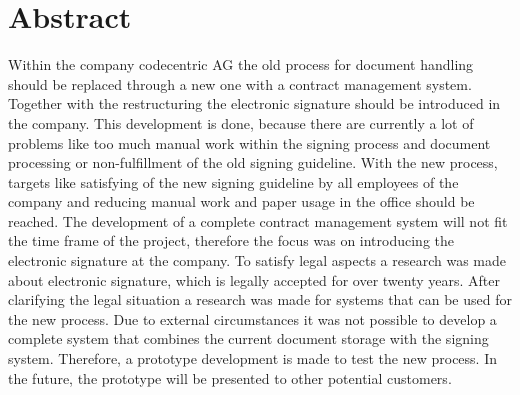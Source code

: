 \section*{Abstract}
Within the company codecentric AG the old process for document handling should be replaced through a new one with a contract management system. Together with the restructuring the electronic signature should be introduced in the company. This development is done, because there are currently a lot of problems like too much manual work within the signing process and document processing or non-fulfillment of the old signing guideline. \newline
With the new process, targets like satisfying of the new signing guideline by all employees of the company and reducing manual work and paper usage in the office should be reached. The development of a complete contract management system will not fit the time frame of the project, therefore the focus was on introducing the electronic signature at the company. To satisfy legal aspects a research was made about electronic signature, which is legally accepted for over twenty years. After clarifying the legal situation a research was made for systems that can be used for the new process. \newline
Due to external circumstances it was not possible to develop a complete system that combines the current document storage with the signing system. Therefore, a prototype development is made to test the new process. In the future, the prototype will be presented to other potential customers. 

